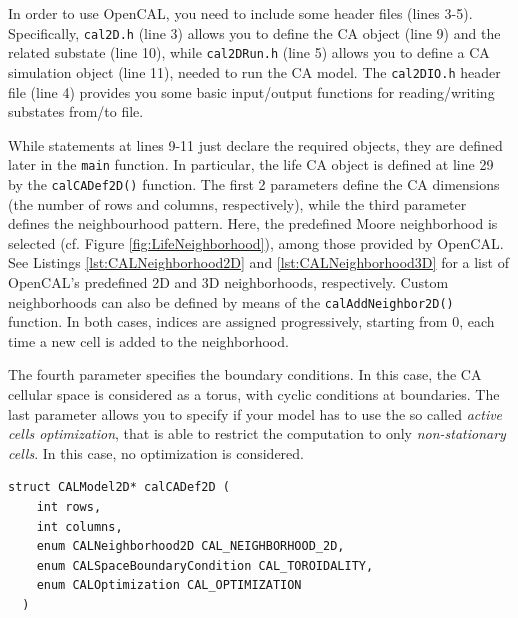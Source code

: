 In order to use OpenCAL, you need to include some header files (lines
3-5). Specifically, \verb'cal2D.h' (line 3) allows you to define the
CA object (line 9) and the related substate (line 10), while
\verb'cal2DRun.h' (line 5) allows you to define a CA simulation object
(line 11), needed to run the CA model. The \verb'cal2DIO.h' header
file (line 4) provides you some basic input/output functions for
reading/writing substates from/to file.

While statements at lines 9-11 just declare the required objects, they
are defined later in the \verb'main' function. In particular, the life
CA object is defined at line 29 by the \verb'calCADef2D()'
function. The first 2 parameters define the CA dimensions (the number
of rows and columns, respectively), while the third parameter defines
the neighbourhood pattern. Here, the predefined Moore neighborhood is
selected (cf. Figure \ref{fig:LifeNeighborhood}), among those provided
by OpenCAL. See Listings \ref{lst:CALNeighborhood2D} and
\ref{lst:CALNeighborhood3D} for a list of OpenCAL's predefined 2D and
3D neighborhoods, respectively. Custom neighborhoods can also be
defined by means of the \verb'calAddNeighbor2D()' function. In both
cases, indices are assigned progressively, starting from 0, each time
a new cell is added to the neighborhood.

The fourth parameter specifies the boundary conditions. In this case,
the CA cellular space is considered as a torus, with cyclic conditions
at boundaries. The last parameter allows you to specify if your model
has to use the so called \emph{active cells optimization}, that is
able to restrict the computation to only \emph{non-stationary
  cells}. In this case, no optimization is considered.

\begin{lstlisting}[float,floatplacement=H, label=lst:calCADef2D, caption=Definition of the calCADef2D() function., numbers=none]
  struct CALModel2D* calCADef2D (
    int rows,
    int columns,
    enum CALNeighborhood2D CAL_NEIGHBORHOOD_2D,
    enum CALSpaceBoundaryCondition CAL_TOROIDALITY,
    enum CALOptimization CAL_OPTIMIZATION
  )
\end{lstlisting}  

